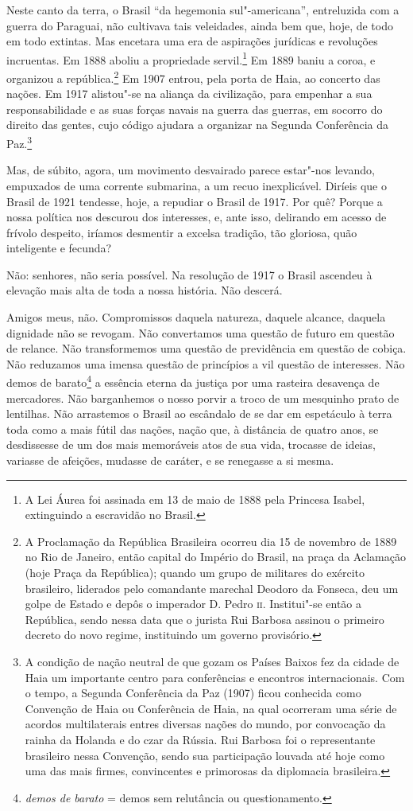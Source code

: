 Neste canto da terra, o Brasil ``da hegemonia
sul"-americana'', entreluzida com a guerra do Paraguai, não
cultivava tais veleidades, ainda bem que, hoje, de todo em todo
extintas. Mas encetara uma era de aspirações jurídicas e revoluções
incruentas. Em 1888 aboliu a propriedade servil.\footnote{ A Lei Áurea
foi assinada em 13 de maio de
1888 pela Princesa
Isabel, extinguindo a escravidão no
Brasil.} Em 1889 baniu a coroa, e organizou a
república.\footnote{ A Proclamação da República Brasileira ocorreu dia
15 de novembro de 1889
no Rio de Janeiro, então capital do
Império do Brasil, na praça da Aclamação (hoje
Praça da República); quando um grupo de
militares do exército brasileiro, liderados
pelo comandante marechal Deodoro da Fonseca,
deu um golpe de Estado e depôs o imperador
D. Pedro \textsc{ii}. Institui"-se então a
República, sendo nessa data que o jurista
Rui Barbosa assinou o primeiro decreto do novo
regime, instituindo um governo provisório.} Em 1907 entrou, pela
porta de Haia, ao concerto das nações. Em 1917 alistou"-se na aliança da
civilização, para empenhar a sua responsabilidade e as suas forças
navais na guerra das guerras, em socorro do direito das gentes, cujo
código ajudara a organizar na Segunda Conferência da Paz.\footnote{ A
condição de nação neutral de que gozam os Países
Baixos fez da cidade de Haia um importante
centro para conferências e encontros internacionais. Com o tempo, a
Segunda Conferência  da Paz (1907) ficou conhecida como
Convenção de Haia ou Conferência de Haia, na qual
ocorreram uma série de acordos multilaterais entres diversas nações do
mundo, por convocação da rainha da Holanda e do czar da Rússia.
Rui Barbosa foi o representante
brasileiro nessa Convenção, sendo sua
participação louvada até hoje como uma das mais firmes, convincentes e
primorosas da diplomacia brasileira.}

Mas, de súbito, agora, um movimento desvairado parece estar"-nos
levando, empuxados de uma corrente submarina, a um recuo inexplicável.
Diríeis que o Brasil de 1921 tendesse, hoje, a repudiar o Brasil de
1917. Por quê? Porque a nossa política nos descurou dos interesses, e,
ante isso, delirando em acesso de frívolo despeito, iríamos desmentir a
excelsa tradição, tão gloriosa, quão inteligente e fecunda?

Não: senhores, não seria possível. Na resolução de 1917 o Brasil
ascendeu à elevação mais alta de toda a nossa história. Não descerá.

Amigos meus, não. Compromissos daquela natureza, daquele alcance,
daquela dignidade não se revogam. Não convertamos uma questão de futuro
em questão de relance. Não transformemos uma questão de previdência em
questão de cobiça. Não reduzamos uma imensa questão de princípios a vil
questão de interesses. Não demos de barato\footnote{ \textit{demos de
barato} = demos sem relutância ou questionamento.} a essência
eterna da justiça por uma rasteira desavença de mercadores. Não
barganhemos o nosso porvir a troco de um mesquinho prato de lentilhas.
Não arrastemos o Brasil ao escândalo de se dar em espetáculo à terra
toda como a mais fútil das nações, nação que, à distância de quatro
anos, se desdissesse de um dos mais memoráveis atos de sua vida,
trocasse de ideias, variasse de afeições, mudasse de caráter, e se
renegasse a si mesma.

